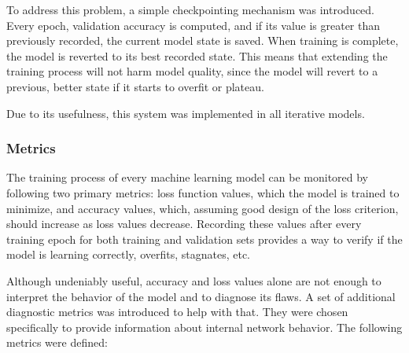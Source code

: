\documentclass[a4paper,11pt,twoside]{report}
\theoremstyle{definition}
\begin{document}
To address this problem, a simple checkpointing mechanism was introduced. Every epoch, validation accuracy is computed, and if its value is greater than previously recorded, the current model state is saved. When training is complete, the model is reverted to its best recorded state. This means that extending the training process will not harm model quality, since the model will revert to a previous, better state if it starts to overfit or plateau. 

Due to its usefulness, this system was implemented in all iterative models.

\subsubsection{Metrics}
\label{section:dnn-model-metrics}

The training process of every machine learning model can be monitored by following two primary metrics: loss function values, which the model is trained to minimize, and accuracy values, which, assuming good design of the loss criterion, should increase as loss values decrease. Recording these values after every training epoch for both training and validation sets provides a way to verify if the model is learning correctly, overfits, stagnates, etc.

Although undeniably useful, accuracy and loss values alone are not enough to interpret the behavior of the model and to diagnose its flaws. A set of additional diagnostic metrics was introduced to help with that. They were chosen specifically to provide information about internal network behavior. The following metrics were defined:
\end{document}
